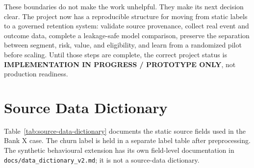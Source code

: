\documentclass[a4paper,12pt]{article}
\begin{document}
These boundaries do not make the work unhelpful. They make its next decision clear. The project now has a reproducible structure for moving from static labels to a governed retention system: validate source provenance, collect real event and outcome data, complete a leakage-safe model comparison, preserve the separation between segment, risk, value, and eligibility, and learn from a randomized pilot before scaling. Until those steps are complete, the correct project status is \textbf{IMPLEMENTATION IN PROGRESS / PROTOTYPE ONLY}, not production readiness.

\appendix
\section{Source Data Dictionary}
\label{app:data-dictionary}

Table~\ref{tab:source-data-dictionary} documents the static source fields used in the Bank X case. The churn label is held in a separate label table after preprocessing. The synthetic behavioural extension has its own field-level documentation in \texttt{docs/data\_dictionary\_v2.md}; it is not a source-data dictionary.
\end{document}
